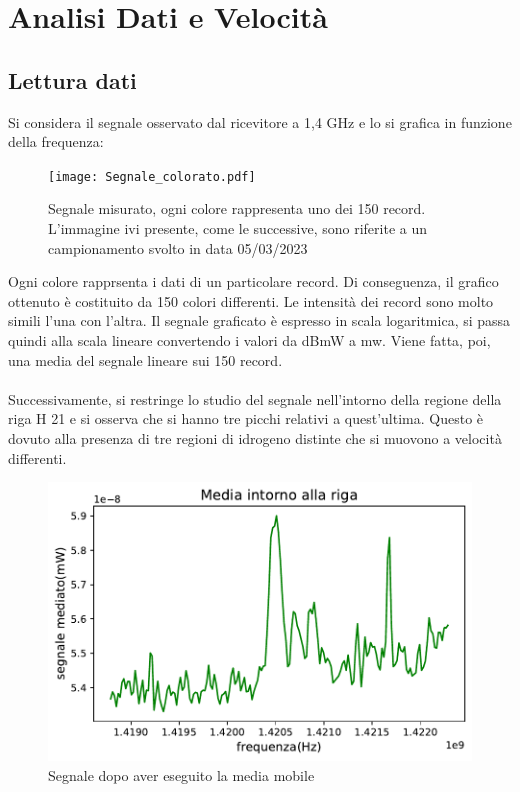\section{Analisi Dati e Velocità}
\label{Analisi Dati e Velocità}



\subsection{Lettura dati}

Si considera il segnale osservato dal ricevitore a 1,4 GHz e lo si grafica in funzione della frequenza:

\begin{figure}[H]
	\centering
	\texttt{[image: Segnale\_colorato.pdf]}
	\caption{Segnale misurato, ogni colore rappresenta uno dei 150 record. L'immagine ivi presente, come le successive, sono riferite a un campionamento svolto in data 05/03/2023}
    	\label{fig:Segnale_colorato}
\end{figure}

Ogni colore rapprsenta i dati di un particolare record. Di conseguenza, il grafico ottenuto è costituito da 150 colori differenti. Le intensità dei record sono molto simili l'una con l'altra.
Il segnale graficato è espresso in scala logaritmica, si passa quindi alla scala lineare convertendo i valori da dBmW a mw. Viene fatta, poi, una media del segnale lineare sui 150 record.
\\\\
Successivamente, si restringe lo studio del segnale nell'intorno della regione della riga H 21 e si osserva che si hanno tre picchi relativi a quest'ultima. Questo è dovuto alla presenza di tre regioni di idrogeno distinte che si muovono a velocità differenti.

\begin{figure}[H]
	\centering
	\includegraphics[scale=0.8]{Media_segnale.pdf}
	\caption{Segnale dopo aver eseguito la media mobile}
    	\label{fig:Media_segnale}
\end{figure}  

